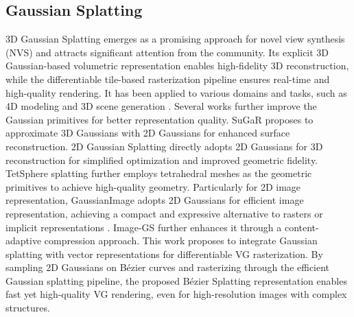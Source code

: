 \vspace{-.5em}
\subsection{Gaussian Splatting} 
\vspace{-.5em}

3D Gaussian Splatting \cite{kerbl3Dgaussians, zwicker2001ewa} emerges as a promising approach for novel view synthesis (NVS) and attracts significant attention from the community. Its explicit 3D Gaussian-based volumetric representation enables high-fidelity 3D reconstruction, while the differentiable tile-based rasterization pipeline ensures real-time and high-quality rendering. It has been applied to various domains and tasks, such as 4D modeling \cite{luiten2023dynamic,Wu_2024_CVPR} and 3D scene generation \cite{yi2023gaussiandreamer, tang2024dreamgaussian}.
Several works further improve the Gaussian primitives for better representation quality. SuGaR \cite{guedon2023sugar} proposes to approximate 3D Gaussians with 2D Gaussians for enhanced surface reconstruction. 2D Gaussian Splatting \cite{Huang2DGS2024} directly adopts 2D Gaussians for 3D reconstruction for simplified optimization and improved geometric fidelity.
TetSphere splatting\cite{guo2024tetsphere} further employs tetrahedral meshes as the geometric primitives to achieve high-quality geometry. 
Particularly for 2D image representation, GaussianImage \cite{zhang2024gaussianimage} adopts 2D Gaussians \cite{Huang2DGS2024} for efficient image representation, achieving a compact and expressive alternative to rasters or implicit representations \cite{sitzmann2020implicit,muller2022instant}. 
Image-GS \cite{zhang2024imagegscontentadaptiveimagerepresentation} further enhances it through a content-adaptive compression approach. This work proposes to integrate Gaussian splatting with vector representations for differentiable VG rasterization. By sampling 2D Gaussians on Bézier curves and rasterizing through the efficient Gaussian splatting pipeline, the proposed Bézier Splatting representation enables fast yet high-quality VG rendering, even for high-resolution images with complex structures.


